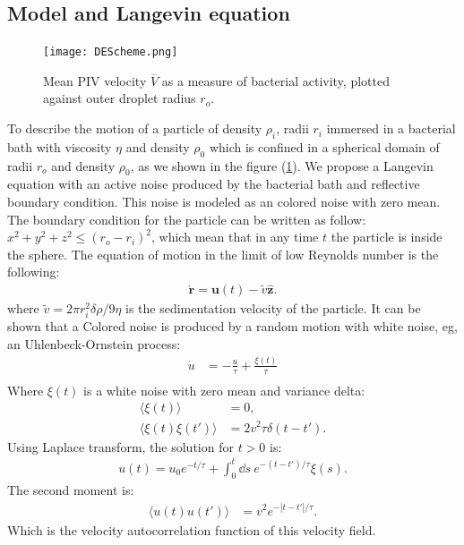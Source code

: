 \documentclass[%
10pt,
superscriptaddress,
twocolumn,
 amsmath,amssymb,
 aps,prx,
]{revtex4-2}
\begin{document}
\subsection*{Model and Langevin equation}
\begin{figure}[!t]
  \texttt{[image: DEScheme.png]}
  \caption{
  Mean PIV velocity $\overline V$ as a measure of bacterial activity, plotted against outer droplet radius $r_o$.
  }
  \label{fig:DE_scheme}
\end{figure}
 To describe the motion of a particle of density $\rho_i$, radii $r_i$ immersed in a bacterial bath with viscosity $\eta$ and density $\rho_0$ which is confined in a spherical domain of radii $r_o$ and density $\rho_0$, as we shown in the figure (\ref{fig:DE_scheme}).
 We propose a Langevin equation with an active noise produced by the bacterial bath and reflective boundary condition. 
 This noise is modeled as an colored noise with zero mean.
 The boundary condition for the particle can be written as follow: $x^2+y^2+z^2\leq (r_o-r_i)^2$, which mean that in any time $t$ the particle is inside the sphere.  
The equation of motion in the limit of low Reynolds number is the following:
\begin{align}
  \label{eq.Langevin_num}
  \mathbf{\dot{r}}=\mathbf{u}(t)-\tilde{v}\mathbf{\hat{z}}.
\end{align}
where  $\tilde{v}=2\pi r_i^2 \delta\rho/9\eta$ is the sedimentation velocity of the particle.
It can be shown that a Colored noise is produced by a random motion with white noise, eg, an Uhlenbeck-Ornstein process:
\begin{align}
  \dot{u}&=-\frac{u}{\tau}+\frac{\xi(t)}{\tau}\\
\end{align}
Where $\xi(t)$ is a white noise with zero mean and variance delta:
\begin{align}
  \langle \xi(t)\rangle &=0,\\
  \langle \xi(t)\xi(t')\rangle &=2v^2\tau\delta(t-t').
\end{align}
Using Laplace transform, the solution for $t>0$ is:
\begin{align}
  u(t)=u_0e^{-t/\tau}+\int_0^{t} \dd s \ e^{-(t-t')/\tau}\xi(s).
\end{align}
 The second moment is:
\begin{align}
  \langle u(t)u(t')\rangle &=v^2e^{-|t-t'|/\tau}. 
\end{align}
Which is the velocity autocorrelation function of this velocity field.
\end{document}
